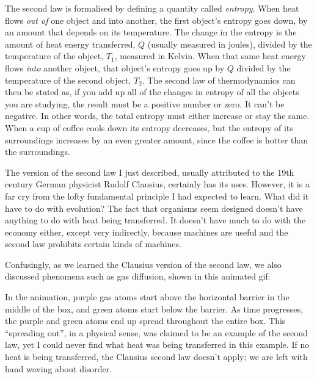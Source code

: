 \documentclass[a4paper, 12pt]{article}
\begin{document}
The second law is formalised by defining a quantity called
{\em entropy}. When heat flows {\em out of} one object and into another,
the first object's entropy goes
down, by an amount that depends on its temperature.
The change in the entropy is the amount of heat energy transferred,
$Q$ (usually measured in joules),
divided by the temperature of the object, $T_1$, measured in Kelvin.
When that same heat energy flows {\em into} another object, that object's
entropy goes up by $Q$ divided by the temperature of the
second object, $T_2$. The second law of thermodynamics can then be stated as, if you
add up all of the changes in entropy of all the objects you are studying,
the result must be a positive number or zero. It can't be negative. In other
words, the total entropy must either increase or stay the same.
When a cup of coffee cools down its entropy decreases, but the entropy of its
surroundings increases by an even greater amount,
since the coffee is hotter than the surroundings.

The version of
the second law I just described, usually attributed to the 19th century
German physicist Rudolf Clausius, certainly has its uses. However, it is a far
cry from the lofty fundamental principle I had expected to learn. What did it
have to do with evolution? The fact that organisms seem designed doesn't have
anything to do with heat being transferred. It doesn't have much to do
with the economy either, except very indirectly, because machines are useful
and the second law prohibits certain kinds of machines.

Confusingly, as we learned the Clausius version of the second law, we also
discussed phenomena such as gas diffusion, shown in this animated gif:

\begin{figure}[ht!]
\centering
{}
\end{figure}

In the animation, purple gas atoms start above the horizontal barrier in the
middle of the box, and green atoms start below the barrier.
As time progresses, the purple and green atoms end up spread throughout the entire
box. This ``spreading out'', in a physical sense, was claimed to be an example
of the second law, yet I could never find what heat was being transferred
in this example. If no heat is being transferred, the Clausius second law
doesn't apply; we are left with hand waving about disorder.
\end{document}
